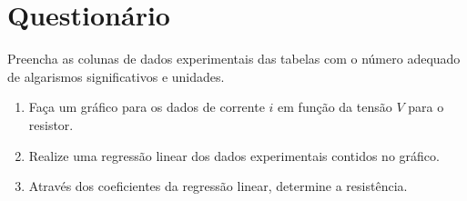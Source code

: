 
\vspace{15mm}

\begin{fullwidth}
\noindent{}
\vspace{5mm}

\noindent{}

\noindent{}

\noindent{}

\noindent{}

\noindent{}
\end{fullwidth}

\vspace{5mm}

\section{Questionário}

\begin{question}[type={exam}]{2}
Preencha as colunas de dados experimentais das tabelas com o número adequado de algarismos significativos e unidades.
\end{question}

\begin{question}[type={exam}]{2}
\begin{enumerate}[label=\roman*.]
\item Faça um gráfico para os dados de corrente $i$ em função da tensão $V$ para o resistor.
\item Realize uma regressão linear dos dados experimentais contidos no gráfico.
\item Através dos coeficientes da regressão linear, determine a resistência.
\end{enumerate}
\end{question}


